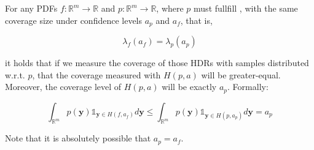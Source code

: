 \begin{lemma}\label{lem:hdr_optimality_mll}
    For any PDFs $f: \mathbb{R}^m \to \mathbb{R}$ and $p: \mathbb{R}^m \to \mathbb{R}$, where $p$ must fullfill , with the same coverage size under confidence levels $a_p$ and $a_f$, that is,

    \begin{equation}
        \lambda_f(a_f) = \lambda_p(a_p)
    \end{equation}

    it holds that if we measure the coverage of those HDRs with samples distributed w.r.t. $p$, that the coverage measured with $H(p,a)$ will be greater-equal. Moreover, the coverage level of $H(p,a)$ will be exactly $a_p$. Formally:

    \begin{equation}
        \int_{\mathbb{R}^{m}} p(\mathbf{y}) \mathds1_{\mathbf{y} \in H(f, a_f)} d
        \mathbf{y} \leq \int_{\mathbb{R}^{m}} p(\mathbf{y})
        \mathds1_{\mathbf{y} \in
            H(p, a_p)} d \mathbf{y} = a_p
    \end{equation}
\end{lemma}
Note that it is absolutely possible that $a_p = a_f$.
